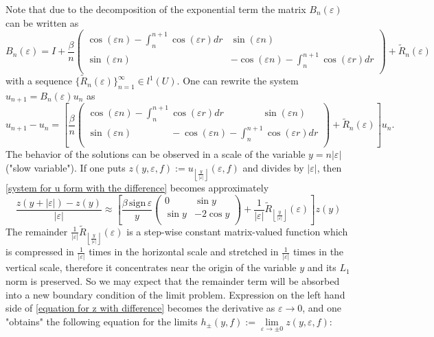 \documentclass[a4paper,oneside,12pt]{amsart}
\begin{document}
Note that due to the decomposition of the exponential term the matrix $B_n(\varepsilon)$ can be written as
\begin{equation*}
    B_n(\varepsilon)=I+\frac{\beta}n
    \left(
      \begin{array}{cc}
        \cos(\varepsilon n)-\int_n^{n+1}\cos(\varepsilon r)dr & \sin(\varepsilon n) \\
        \sin(\varepsilon n) & -\cos(\varepsilon n)-\int_n^{n+1}\cos(\varepsilon r)dr \\
      \end{array}
    \right)
    +\widetilde R_n(\varepsilon)
\end{equation*}
with a sequence $\{\widetilde R_n(\varepsilon)\}_{n=1}^{\infty}\in l^1(U)$. One can rewrite the system $u_{n+1}=B_n(\varepsilon)u_n$ as
\begin{equation}\label{system for u form with the difference}
    u_{n+1}-u_n=
    \left[
    \frac{\beta}n
    \left(
      \begin{array}{c}
        \cos(\varepsilon n)-\int_n^{n+1}\cos(\varepsilon r)dr \quad\quad\quad\quad \sin(\varepsilon n) \\
        \sin(\varepsilon n) \quad\quad\quad\quad -\cos(\varepsilon n)-\int_n^{n+1}\cos(\varepsilon r)dr \\
      \end{array}
    \right)
    +\widetilde R_n(\varepsilon)
    \right]
    u_n.
\end{equation}
The behavior of the solutions can be observed in a scale of the variable $y=n|\varepsilon|$ ("slow variable"). If one puts $z(y,\varepsilon,f):=u_{\left\lfloor\frac{y}{|\varepsilon|}\right\rfloor}(\varepsilon,f)$ and divides by $|\varepsilon|$, then \eqref{system for u form with the difference} becomes approximately
\begin{equation}\label{equation for z with difference}
    \frac{z(y+|\varepsilon|)-z(y)}{|\varepsilon|}\approx
    \left[
    \frac{\beta\,\text{sign}\,\varepsilon}y
    \left(
      \begin{array}{cc}
        0 & \sin y \\
        \sin y & -2\cos y \\
      \end{array}
    \right)
    +\frac1{|\varepsilon|}\widetilde R_{\left\lfloor\frac{y}{|\varepsilon|}\right\rfloor}(\varepsilon)
    \right]
    z(y)
\end{equation}
The remainder
$\frac1{|\varepsilon|}\widetilde R_{\left\lfloor\frac{y}{|\varepsilon|}\right\rfloor}(\varepsilon)$ is a step-wise constant matrix-valued function which is compressed in $\frac1{|\varepsilon|}$ times in the horizontal scale and stretched in $\frac1{|\varepsilon|}$ times in the vertical scale, therefore it concentrates near the origin of the variable $y$ and its $L_1$ norm is preserved. So we may expect that the remainder term will be absorbed into a new boundary condition of the limit problem. Expression on the left hand side of \eqref{equation for z with difference} becomes the derivative as $\varepsilon\rightarrow0$, and one "obtains" the following equation for the limits $h_{\pm}(y,f):=\lim\limits_{\varepsilon\rightarrow\pm0}z(y,\varepsilon,f)$:
\end{document}
